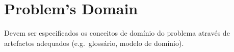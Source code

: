 \section{Problem's Domain} %
\label{sec:dominio}

Devem ser especificados os conceitos de domínio do problema através de artefactos adequados (e.g.\ glossário, modelo de domínio).

